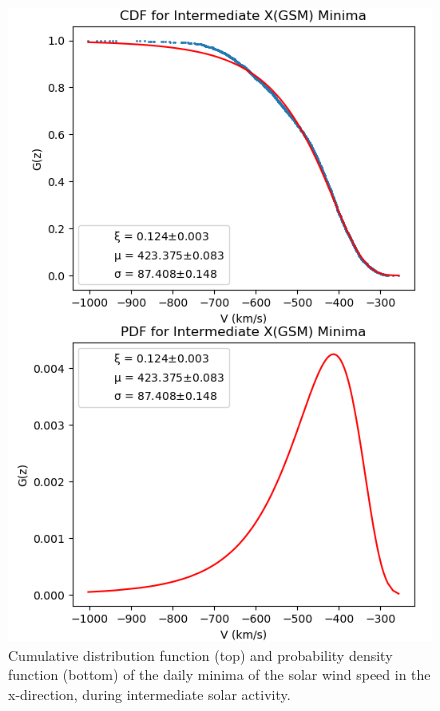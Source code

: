 \documentclass[11pt]{article}
\begin{document}
        \begin{figure}[t!]
            \begin{minipage}{0.48\textwidth}
                \centering
                \includegraphics[width=\textwidth]{fig_method/SWEintXmin.png}
                \caption{Cumulative distribution function (top) and probability density function (bottom) of the daily minima of the solar wind speed in the x-direction, during intermediate solar activity.}
                \label{fig:SWEintXmin}
            \end{minipage}
            \hfill
            \begin{minipage}{0.48\textwidth}
                \centering

\end{minipage}
\end{figure}
\end{document}
